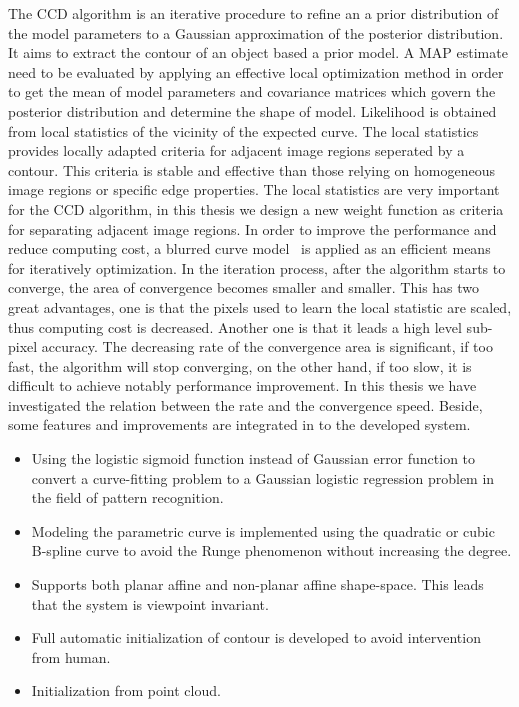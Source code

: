 The CCD algorithm is an iterative procedure to refine an
a prior distribution of the model parameters to a Gaussian
approximation of the posterior distribution. It aims to extract the
contour of an object based a prior model. A MAP estimate need to be
evaluated by applying an effective local optimization method in order to get
the mean of model parameters and covariance matrices which govern the
posterior distribution and determine the shape of model. Likelihood is 
obtained from local statistics of the vicinity of the expected
curve. The local statistics provides locally adapted criteria for
adjacent image regions seperated by a contour. This criteria is stable
and effective than those relying on homogeneous image regions or
specific edge properties. The local statistics are very
important for the CCD algorithm, in this thesis we design a new weight
function as criteria for separating adjacent image regions. 
 In order to improve the performance and
reduce computing cost, a blurred curve model~\cite{hanek2004contracting} is applied as an efficient means for
iteratively optimization. In the iteration process, after the
algorithm starts to converge, the area of
convergence becomes smaller and smaller. This has two great
advantages, one is that the pixels used to learn the local statistic
are scaled, thus computing cost is decreased. Another one is that it
leads a high level sub-pixel accuracy. The decreasing rate of the
convergence area is significant, if too fast, the algorithm will stop
converging, on the other hand, if too slow, it is difficult to achieve
notably performance improvement. In this thesis we have investigated the relation between
the rate and the convergence speed.
Beside, some features and improvements are integrated in to the
developed system.
\begin{itemize}
\item Using the logistic sigmoid function instead of Gaussian error
  function to convert a curve-fitting problem to a Gaussian logistic
  regression problem in the field of pattern recognition.
\item Modeling the parametric curve is implemented using the quadratic or
cubic B-spline curve  to avoid the Runge phenomenon without increasing
the degree.
\item Supports both planar affine and non-planar affine
  shape-space. This leads that the system is viewpoint invariant.
\item Full automatic initialization of contour is developed to avoid
  intervention from human.
\item Initialization from point cloud.
\end{itemize}

